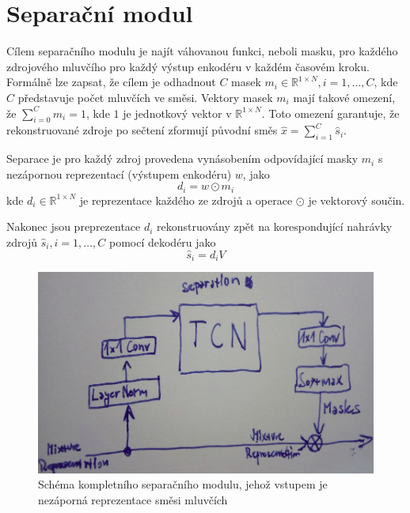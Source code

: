 
\section{Separační modul}
Cílem separačního modulu je najít váhovanou funkci, neboli masku, pro každého zdrojového mluvčího pro každý výstup enkodéru v každém časovém kroku. Formálně lze zapsat, že cílem je odhadnout $C$ masek $m_i \in \mathbb{R}^{1 \times N}, i = 1, \dots, C$, kde $C$ představuje počet mluvčích ve směsi. Vektory masek $m_i$ mají takové omezení, že $\sum_{i=0}^{C}m_i=1$, kde $1$ je jednotkový vektor v $\mathbb{R}^{1 \times N}$. Toto omezení garantuje, že rekonstruované zdroje po sečtení zformují původní směs $\hat{x} = \sum_{i=1}^{C}\hat{s}_i$.

Separace je pro každý zdroj provedena vynásobením odpovídající masky $m_i$ s nezápornou reprezentací (výstupem enkodéru) $w$, jako
\begin{equation}
	d_i = w \odot m_i
\end{equation}
kde $d_i \in \mathbb{R}^{1 \times N}$ je reprezentace každého ze zdrojů a operace $\odot$ je  vektorový součin. 

Nakonec jsou preprezentace $d_i$ rekonstruovány zpět na korespondující nahrávky zdrojů $\hat{s}_i, i = 1, \dots, C$ pomocí dekodéru jako
\begin{equation}
  \hat{s}_i = d_iV
\end{equation}


\begin{figure}[H]
    \centering
    \includegraphics[scale=0.35]{obrazky-figures/separation_module_scheme.png}
    \caption{\label{fig:tasnet-autoenkoder}Schéma kompletního separačního modulu, jehož vstupem je nezáporná reprezentace směsi mluvčích}
\end{figure}

